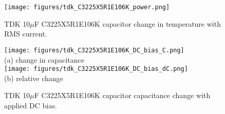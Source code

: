 \documentclass[10pt,twoside]{article}
\begin{document}
\begin{figure}[p]
  \begin{center}
    \texttt{[image: figures/tdk\_C3225X5R1E106K\_power.png]}
  \end{center}
  \caption{TDK 10$\mu$F C3225X5R1E106K capacitor change in temperature with RMS current.}
  \label{fig:tdk_power}
\end{figure}

\begin{figure}[p]
  \begin{center}
    \texttt{[image: figures/tdk\_C3225X5R1E106K\_DC\_bias\_C.png]}\\
    (a) change in capacitance\\
    $\quad$\\
    \texttt{[image: figures/tdk\_C3225X5R1E106K\_DC\_bias\_dC.png]}\\
    (b) relative change\\
  \end{center}
  \caption{TDK 10$\mu$F C3225X5R1E106K capacitor capacitance change with applied DC bias.}
  \label{fig:tdk_DC_bias}
\end{figure}

\end{document}

